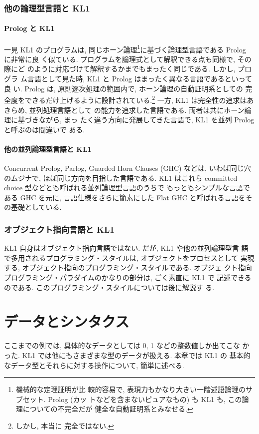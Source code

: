 \documentclass[a4,titlepage]{jsreport}
\begin{document}
\subsubsection{他の論理型言語と KL1}
\paragraph{Prolog と KL1}
一見 KL1 のプログラムは, 同じホーン論理\footnote{機械的な定理証明が比
較的容易で, 表現力もかなり大きい一階述語論理のサブセット.  Prolog (カッ
トなどを含まないピュアなもの) も KL1 も, この論理についての不完全だが
健全な自動証明系とみなせる.}に基づく論理型言語である Prolog に非常に良
く似ている.  プログラムを論理式として解釈できる点も同様で, その際にど
のように対応づけて解釈するかまでもまったく同じである. しかし, プログラ
ム言語として見た時, KL1 と Prolog はまったく異なる言語であるといって良
い.  Prolog は, 原則逐次処理の範囲内で, ホーン論理の自動証明系としての
完全度をできるだけ上げるように設計されている.\footnote{しかし, 本当に
完全ではない.} 一方, KL1 は完全性の追求はあきらめ, 並列処理言語として
の能力を追求した言語である.  両者は共にホーン論理に基づきながら, まっ
たく違う方向に発展してきた言語で, KL1 を並列 Prolog と呼ぶのは間違いで
ある.

\paragraph{他の並列論理型言語と KL1}
Concurrent Prolog\cite{CP}, Parlog\cite{parlog}, Guarded Horn Clauses
(GHC) などは, いわば同じ穴のムジナで, ほぼ同じ方向を目指した言語である.
KL1 はこれら committed choice 型などとも呼ばれる並列論理型言語のうちで
もっともシンプルな言語である GHC を元に, 言語仕様をさらに簡素にした 
Flat GHC と呼ばれる言語をその基礎としている.

\subsubsection{オブジェクト指向言語と KL1}
KL1 自身はオブジェクト指向言語ではない.  だが, KL1 や他の並列論理型言
語で多用されるプログラミング・スタイルは, オブジェクトをプロセスとして
実現する, オブジェクト指向のプログラミング・スタイルである.  オブジェ
クト指向プログラミング・パラダイムのかなりの部分は, ごく素直に KL1 で
記述できるのである.  このプログラミング・スタイルについては後に解説す
る.

\section{データとシンタクス}
ここまでの例では, 具体的なデータとしては 0, 1 などの整数値しか出てこな
かった.  KL1 では他にもさまざまな型のデータが扱える.  本章では KL1 の
基本的なデータ型とそれらに対する操作について, 簡単に述べる.
\end{document}
